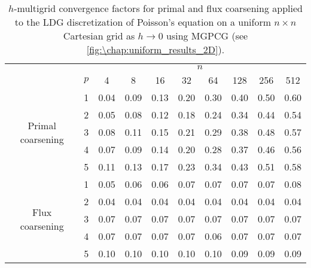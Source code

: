 \begin{table}[htb]
\caption{$h$-multigrid convergence factors for primal and flux coarsening applied to the LDG discretization of Poisson's equation on a uniform $n \times n$ Cartesian grid as ${h\to 0}$ using MGPCG (see \cref{fig:\chap:uniform_results_2D}).\vspace{-1.8em}}
\label{tab:2D_uniform_mgpcg}
\centering
\small
\begin{tabular}{@{}cl@{\qquad}cccccccc@{}}
&&&&&&&&& \\ \midrule
&& \multicolumn{8}{c}{$n$} \\
& $p$ & 4 & 8 & 16 & 32 & 64 & 128 & 256 & 512 \\ \cmidrule{1-10}
\multirow{5}{*}{Primal coarsening}
& 1 & 0.04 & 0.09 & 0.13 & 0.20 & 0.30 & 0.40 & 0.50 & 0.60 \\ 
& 2 & 0.05 & 0.08 & 0.12 & 0.18 & 0.24 & 0.34 & 0.44 & 0.54 \\ 
& 3 & 0.08 & 0.11 & 0.15 & 0.21 & 0.29 & 0.38 & 0.48 & 0.57 \\ 
& 4 & 0.07 & 0.09 & 0.14 & 0.20 & 0.28 & 0.37 & 0.46 & 0.56 \\ 
& 5 & 0.11 & 0.13 & 0.17 & 0.23 & 0.34 & 0.43 & 0.51 & 0.58 \\ \cmidrule{1-10}
\multirow{5}{*}{Flux coarsening}
& 1 & 0.05 & 0.06 & 0.06 & 0.07 & 0.07 & 0.07 & 0.07 & 0.08 \\ 
& 2 & 0.04 & 0.04 & 0.04 & 0.04 & 0.04 & 0.04 & 0.04 & 0.04 \\ 
& 3 & 0.07 & 0.07 & 0.07 & 0.07 & 0.07 & 0.07 & 0.07 & 0.07 \\ 
& 4 & 0.07 & 0.07 & 0.07 & 0.07 & 0.06 & 0.07 & 0.07 & 0.07 \\ 
& 5 & 0.10 & 0.10 & 0.10 & 0.10 & 0.10 & 0.09 & 0.09 & 0.09 \\ \midrule
\end{tabular}
\end{table}

